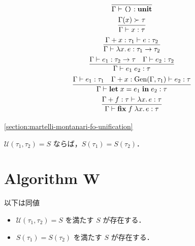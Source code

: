 \begin{gather*}
  \infer{\Gamma \vdash \text{\texttt{()}}: \mathbf{unit}}{}
  \\
  \infer{\Gamma \vdash x: \tau}{
    \Gamma(x) \succ \tau
  }
  \\
  \infer{\Gamma \vdash \lambda x\ldotp e: \tau_1 \to \tau_2}{
    \Gamma + x:\tau_1\vdash e: \tau_2
  }
  \\
  \infer{\Gamma \vdash e_1\; e_2: \tau}{
    \Gamma \vdash e_1: \tau_2 \to \tau
    &
    \Gamma \vdash e_2: \tau_2
  }
  \\
  \infer{\Gamma \vdash \mathbf{let}\; x = e_1\; \mathbf{in}\; e_2: \tau}{
    \Gamma \vdash e_1: \tau_1
    &
    \Gamma + x: \mathrm{Gen}(\Gamma, \tau_1) \vdash e_2: \tau
  }
  \\
  \infer{\Gamma \vdash \mathbf{fix}\;f\;\lambda x\ldotp e: \tau}{
    \Gamma + f: \tau \vdash \lambda x\ldotp e: \tau
  }
\end{gather*}

\cref{section:martelli-montanari-fo-unification}
\begin{theorem}
  $\mathcal{U}(\tau_1, \tau_2) = S$ ならば，$S(\tau_1) = S(\tau_2)$．
\end{theorem}

\section{Algorithm W}

\begin{theorem}
  以下は同値
  \begin{itemize}
    \item $\mathcal{U}(\tau_1, \tau_2) = S$ を満たす $S$ が存在する．
    \item $S(\tau_1) = S(\tau_2)$ を満たす $S$ が存在する．
  \end{itemize}
\end{theorem}

